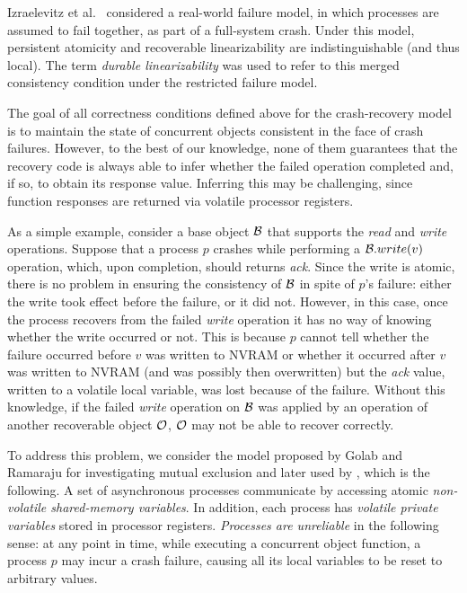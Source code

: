 Izraelevitz et al.~\cite{DBLP:conf/wdag/IzraelevitzMS16} considered a real-world failure model, in which processes are assumed to fail together, as part of a full-system crash. Under this model, persistent atomicity and recoverable linearizability are indistinguishable (and thus local). The term \emph{durable linearizability} was used to refer to this merged consistency condition under the restricted failure model.

The goal of all correctness conditions defined above for the crash-recovery model is to maintain the state of concurrent objects consistent in the face of crash failures. However, to the best of our knowledge, none of them guarantees that the recovery code is always able to infer whether the failed operation completed and, if so, to obtain its response value.
Inferring this  may be challenging, since function responses are returned via volatile processor registers.

As a simple example, consider a base object $\cal{B}$ that supports the \emph{read} and \emph{write} operations. Suppose that a process $p$ crashes while performing a ${\cal{B}}.write(v)$ operation, which, upon completion, should returns \emph{ack}. Since the write is atomic, there is no problem in ensuring the consistency of ${\cal{B}}$ in spite of $p$'s failure: either the write took effect before the failure, or it did not. However, in this case, once the process recovers from the failed \emph{write} operation it has no way of knowing whether the write occurred or not. This is because $p$ cannot tell whether the failure occurred before $v$ was written to NVRAM or whether it occurred after $v$ was written to NVRAM (and was possibly then overwritten) but the \emph{ack} value, written to a volatile local variable, was lost because of the failure. Without this knowledge, if the failed \emph{write} operation on $\cal{B}$ was applied by an operation of another recoverable object $\cal{O}$, $\cal{O}$ may not be able to recover correctly.

To address this problem, we consider the model proposed by Golab and Ramaraju for investigating mutual exclusion \cite{gr:rme} and later used by \cite{DBLP:conf/podc/GolabH17,Jayanti-DISC-17}, which is the following. A set of asynchronous processes communicate by accessing atomic \emph{non-volatile shared-memory variables}. In addition, each process has \emph{volatile private variables} stored in processor registers. \emph{Processes are unreliable} in the following sense: at any point in time, while executing a concurrent object function, a process $p$ may incur a crash failure, causing all its local variables to be reset to arbitrary values.

